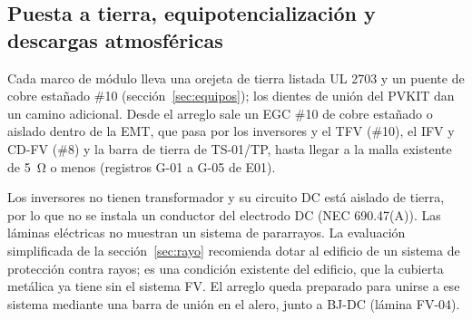 \documentclass[12pt]{article}
\begin{document}
\subsection{Puesta a tierra, equipotencialización y descargas atmosféricas}
Cada marco de módulo lleva una orejeta de tierra listada UL 2703 y un puente de cobre estañado \#10 (sección~\ref{sec:equipos}); los dientes de unión del PVKIT dan un camino adicional. Desde el arreglo sale un EGC \#10 de cobre estañado o aislado dentro de la EMT, que pasa por los inversores y el TFV (\#10), el IFV y CD-FV (\#8) y la barra de tierra de TS-01/TP, hasta llegar a la malla existente de \SI{5}{\ohm} o menos (registros G-01 a G-05 de E01).

Los inversores no tienen transformador y su circuito DC está aislado de tierra, por lo que no se instala un conductor del electrodo DC (NEC 690.47(A)). Las láminas eléctricas no muestran un sistema de pararrayos. La evaluación simplificada de la sección~\ref{sec:rayo} recomienda dotar al edificio de un sistema de protección contra rayos; es una condición existente del edificio, que la cubierta metálica ya tiene sin el sistema FV. El arreglo queda preparado para unirse a ese sistema mediante una barra de unión en el alero, junto a BJ-DC (lámina FV-04).
\end{document}
